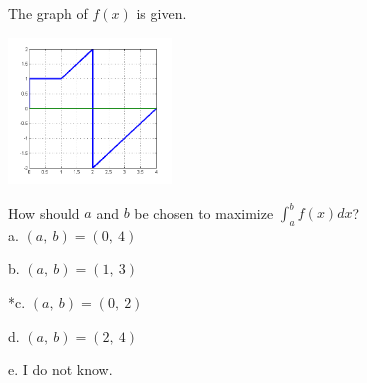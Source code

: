 
The graph of \( f(x) \) is given.

\includegraphics[width=1.71005in,height=1.52489in]{../../Images/IntegralCalculusQ1234.png}

How should \( a \) and \( b \) be chosen to maximize \( \int_a^b f ( x )  dx \)?\\


a. \( ( a,\ b  ) = ( 0,\ 4 ) \)

b. \( ( a,\ b ) = ( 1,\ 3 ) \)

*c. \( ( a,\ b ) = (0,\ 2) \)

d. \( ( a,\ b ) = (2,\ 4) \)

e. I do not know.\\

